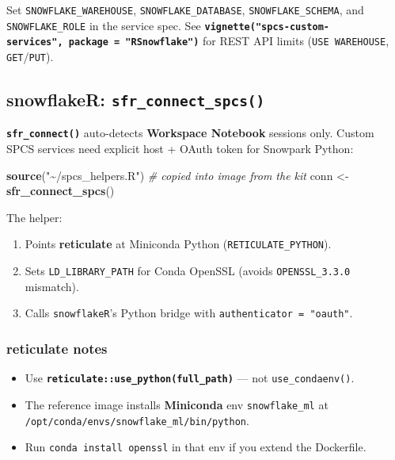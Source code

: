 \documentclass[
]{article}
\newenvironment{Shaded}{\begin{snugshade}}{\end{snugshade}}
\newcommand{\CommentTok}[1]{\textcolor[rgb]{0.56,0.35,0.01}{\textit{#1}}}
\newcommand{\FunctionTok}[1]{\textcolor[rgb]{0.13,0.29,0.53}{\textbf{#1}}}
\newcommand{\NormalTok}[1]{#1}
\newcommand{\OtherTok}[1]{\textcolor[rgb]{0.56,0.35,0.01}{#1}}
\newcommand{\StringTok}[1]{\textcolor[rgb]{0.31,0.60,0.02}{#1}}
\providecommand{\tightlist}{%
  \setlength{\itemsep}{0pt}\setlength{\parskip}{0pt}}
\begin{document}
Set \texttt{SNOWFLAKE\_WAREHOUSE}, \texttt{SNOWFLAKE\_DATABASE},
\texttt{SNOWFLAKE\_SCHEMA}, and \texttt{SNOWFLAKE\_ROLE} in the service
spec. See
\textbf{\texttt{vignette("spcs-custom-services",\ package\ =\ "RSnowflake")}}
for REST API limits (\texttt{USE\ WAREHOUSE},
\texttt{GET}/\texttt{PUT}).

\subsection{\texorpdfstring{snowflakeR:
\texttt{sfr\_connect\_spcs()}}{snowflakeR: sfr\_connect\_spcs()}}\label{snowflaker-sfr_connect_spcs}

\textbf{\texttt{sfr\_connect()}} auto-detects \textbf{Workspace
Notebook} sessions only. Custom SPCS services need explicit host + OAuth
token for Snowpark Python:

\begin{Shaded}
\begin{Highlighting}[]
\FunctionTok{source}\NormalTok{(}\StringTok{"\textasciitilde{}/spcs\_helpers.R"}\NormalTok{)   }\CommentTok{\# copied into image from the kit}
\NormalTok{conn }\OtherTok{\textless{}{-}} \FunctionTok{sfr\_connect\_spcs}\NormalTok{()}
\end{Highlighting}
\end{Shaded}

The helper:

\begin{enumerate}
\def\labelenumi{\arabic{enumi}.}
\tightlist
\item
  Points \textbf{reticulate} at Miniconda Python
  (\texttt{RETICULATE\_PYTHON}).
\item
  Sets \texttt{LD\_LIBRARY\_PATH} for Conda OpenSSL (avoids
  \texttt{OPENSSL\_3.3.0} mismatch).
\item
  Calls \texttt{snowflakeR}'s Python bridge with
  \texttt{authenticator\ =\ "oauth"}.
\end{enumerate}

\subsubsection{reticulate notes}\label{reticulate-notes}

\begin{itemize}
\tightlist
\item
  Use \textbf{\texttt{reticulate::use\_python(full\_path)}} --- not
  \texttt{use\_condaenv()}.
\item
  The reference image installs \textbf{Miniconda} env
  \texttt{snowflake\_ml} at
  \texttt{/opt/conda/envs/snowflake\_ml/bin/python}.
\item
  Run \texttt{conda\ install\ openssl} in that env if you extend the
  Dockerfile.
\end{itemize}
\end{document}
